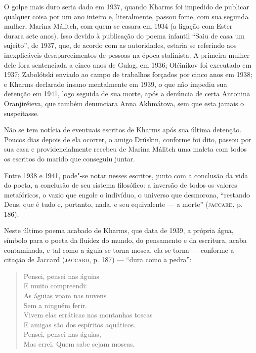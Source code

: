 O golpe mais duro seria dado em 1937, quando Kharms foi impedido de
publicar qualquer coisa por um ano inteiro e, literalmente, passou fome,
com sua segunda mulher, Marina Málitch, com quem se casara em 1934 (a
ligação com Ester durara sete anos). Isso devido à publicação do poema
infantil ``Saiu de casa um sujeito'', de 1937, que, de acordo com as autoridades, estaria se referindo aos
inexplicáveis desaparecimentos de pessoas na época stalinista. A
primeira mulher dele fora sentenciada a cinco anos de Gulag, em 1936;
Oléinikov foi executado em 1937; Zabolótski enviado ao campo de
trabalhos forçados por cinco anos em 1938; e Kharms declarado insano
mentalmente em 1939, o que não impediu sua detenção em 1941, logo
seguida de sua morte, após a denúncia de certa Antonina Oranjiréieva,
que também denunciara Anna Akhmátova, sem que esta jamais o suspeitasse.

Não se tem notícia de eventuais escritos de Kharms após sua última
detenção. Poucos dias depois de ela ocorrer, o amigo Drúskin, conforme
foi dito, passou por sua casa e providencialmente recebeu de Marina
Málitch uma maleta com todos os escritos do marido que conseguiu juntar.

Entre 1938 e 1941, pode"-se notar nesses escritos, junto com a conclusão
da vida do poeta, a conclusão de seu sistema filosófico: a inversão de
todos os valores metafóricos, o vazio que engole o indivíduo, o universo
que desmorona, ``restando Deus, que é tudo e, portanto, nada, e seu
equivalente --- a morte'' (\textsc{jaccard}, p. 186).

Neste último poema acabado de Kharms, que data de 1939, a própria água,
símbolo para o poeta da fluidez do mundo, do pensamento e da escritura,
acaba contaminada, e tal como a águia se torna mosca, ela se torna ---
conforme a citação de Jaccard (\textsc{jaccard}, p. 187) --- ``dura como
a pedra'':

\begin{verse}
Pensei, pensei nas águias \\
E muito compreendi: \\
As águias voam nas nuvens \\
Sem a ninguém ferir. \\
Vivem elas erráticas nas montanhas toscas \\
E amigas são dos espíritos aquáticos. \\
Pensei, pensei nas águias, \\
Mas errei. Quem sabe sejam moscas.
\end{verse}

